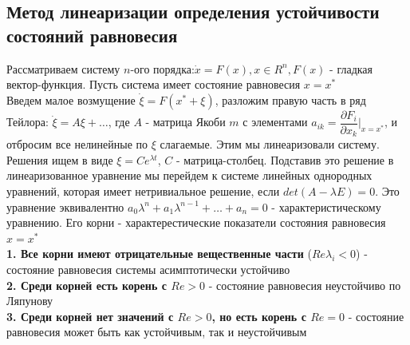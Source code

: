 \begin{multicols*}{2}
		\section{Метод линеаризации определения устойчивости состояний равновесия}
		Рассматриваем систему $n$-ого порядка:$\dot{x} = F(x), x\in R^n, F(x)$ - гладкая вектор-функция. Пусть система имеет состояние равновесия $x = x^*$\\ Введем малое возмущение $\dot{\xi} = F(x^* + \xi)$, разложим правую часть в ряд Тейлора: $\dot{\xi} = A\xi + \dots$, где $A$ - матрица Якоби $m$ с элементами $a_{ik} = \dfrac{\partial F_i}{\partial x_k}|_{x=x^*}$, и отбросим все нелинейные по $\xi$ слагаемые. Этим мы линеаризовали систему.\\
		Решения ищем в виде $\xi = Ce^{\lambda t}$, $C$ - матрица-столбец. Подставив это решение в линеаризованное уравнение мы перейдем к системе линейных однородных уравнений, которая имеет нетривиальное решение, если $det (A-\lambda E) = 0$. Это уравнение эквивалентно $a_0 \lambda ^n + a_1 \lambda ^{n-1} + \dots + a_n = 0$ - характеристическому уравнению. Его корни - характерестические показатели состояния равновесия $x=x^*$\\
		\textbf{1. Все корни имеют отрицательные вещественные части} ($Re \lambda_i < 0$) - состояние равновесия системы асимптотически устойчиво\\
		\textbf{2. Среди корней есть корень с $Re > 0$} - состояние равновесия неустойчиво по Ляпунову\\
		\textbf{3. Среди корней нет значений с $Re > 0$, но есть корень с $Re = 0$} - состояние равновесия может быть как устойчивым, так и неустойчивым
		

\end{multicols*}
